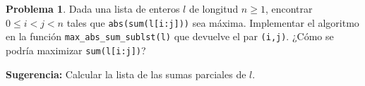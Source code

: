 \documentclass[a4paper, 11pt]{article}
\newcounter{numerodetema}
\theoremstyle{plain}
\theoremstyle{definition}
\newtheorem{prob}{Problema}[numerodetema]
\begin{document}
\begin{prob}
Dada una lista de enteros $l$ de longitud $n\geq 1$, encontrar $0\leq i<j<n$
tales que \texttt{abs(sum(l[i:j]))} sea máxima. Implementar el algoritmo en la
función \texttt{max\_abs\_sum\_sublst(l)} que devuelve el par \texttt{(i,j)}.
¿Cómo se podría maximizar \texttt{sum(l[i:j])}?

\medskip

{\bf Sugerencia:} Calcular la lista de las sumas parciales de $l$.
\end{prob}
\end{document}
